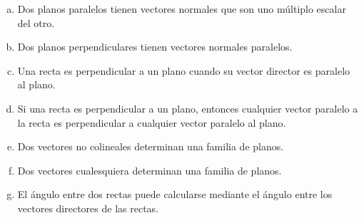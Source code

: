 \documentclass[11pt,a4paper]{article}
\begin{document}
\begin{enumerate}
\begin{enumerate}[a)]
\item Dos planos paralelos tienen vectores normales que son uno m\'ultiplo escalar del otro.
\item Dos planos perpendiculares tienen vectores normales paralelos.
\item Una recta es perpendicular a un plano cuando su vector director es paralelo al plano.
\item Si una recta es perpendicular a un plano, entonces cualquier vector paralelo a la recta es perpendicular a cualquier vector paralelo al plano.
\item Dos vectores no colineales determinan una familia de planos.
\item Dos vectores cualesquiera determinan una familia de planos.
\item El \'angulo entre dos rectas puede calcularse mediante el \'angulo entre los vectores directores de las rectas.
\end{enumerate}

\end{enumerate} %
\end{document}
